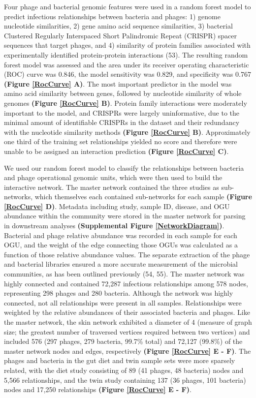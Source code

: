 \documentclass[12pt,]{article}
\begin{document}
Four phage and bacterial genomic features were used in a random forest
model to predict infectious relationships between bacteria and phages:
1) genome nucleotide similarities, 2) gene amino acid sequence
similarities, 3) bacterial Clustered Regularly Interspaced Short
Palindromic Repeat (CRISPR) spacer sequences that target phages, and 4)
similarity of protein families associated with experimentally identified
protein-protein interactions (53). The resulting random forest model was
assessed and the area under its receiver operating characteristic (ROC)
curve was 0.846, the model sensitivity was 0.829, and specificity was
0.767 \textbf{(Figure \ref{RocCurve} A)}. The most important predictor
in the model was amino acid similarity between genes, followed by
nucleotide similarity of whole genomes \textbf{(Figure \ref{RocCurve}
B)}. Protein family interactions were moderately important to the model,
and CRISPRs were largely uninformative, due to the minimal amount of
identifiable CRISPRs in the dataset and their redundancy with the
nucleotide similarity methods \textbf{(Figure \ref{RocCurve} B)}.
Approximately one third of the training set relationships yielded no
score and therefore were unable to be assigned an interaction prediction
\textbf{(Figure \ref{RocCurve} C)}.

We used our random forest model to classify the relationships between
bacteria and phage operational genomic units, which were then used to
build the interactive network. The master network contained the three
studies as sub-networks, which themselves each contained sub-networks
for each sample \textbf{(Figure \ref{RocCurve} D)}. Metadata including
study, sample ID, disease, and OGU abundance within the community were
stored in the master network for parsing in downstream analyses
\textbf{(Supplemental Figure \ref{NetworkDiagram})}. Bacterial and phage
relative abundance was recorded in each sample for each OGU, and the
weight of the edge connecting those OGUs was calculated as a function of
those relative abundance values. The separate extraction of the phage
and bacterial libraries ensured a more accurate measurement of the
microbial communities, as has been outlined previously (54, 55). The
master network was highly connected and contained 72,287 infectious
relationships among 578 nodes, representing 298 phages and 280 bacteria.
Although the network was highly connected, not all relationships were
present in all samples. Relationships were weighted by the relative
abundances of their associated bacteria and phages. Like the master
network, the skin network exhibited a diameter of 4 (measure of graph
size; the greatest number of traversed vertices required between two
vertices) and included 576 (297 phages, 279 bacteria, 99.7\% total) and
72,127 (99.8\%) of the master network nodes and edges, respectively
\textbf{(Figure \ref{RocCurve} E - F)}. The phages and bacteria in the
gut diet and twin sample sets were more sparsely related, with the diet
study consisting of 89 (41 phages, 48 bacteria) nodes and 5,566
relationships, and the twin study containing 137 (36 phages, 101
bacteria) nodes and 17,250 relationships \textbf{(Figure \ref{RocCurve}
E - F)}.
\end{document}
